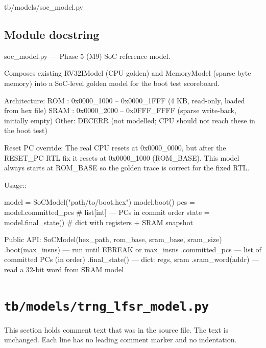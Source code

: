 \begin{relocated}{tb/models/soc_model.py}

\subsection*{Module docstring}

\begin{textblock}
soc_model.py — Phase 5 (M9) SoC reference model.

Composes existing RV32IModel (CPU golden) and MemoryModel (sparse byte
memory) into a SoC-level golden model for the boot test scoreboard.

Architecture:
ROM  : 0x0000_1000 – 0x0000_1FFF  (4 KB, read-only, loaded from hex file)
SRAM : 0x0000_2000 – 0x0FFF_FFFF  (sparse write-back, initially empty)
Other: DECERR (not modelled; CPU should not reach these in the boot test)

Reset PC override:
The real CPU resets at 0x0000_0000, but after the RESET_PC RTL fix it
resets at 0x0000_1000 (ROM_BASE).  This model always starts at ROM_BASE
so the golden trace is correct for the fixed RTL.

Usage::

model = SoCModel("path/to/boot.hex")
model.boot()
pcs  = model.committed_pcs    # list[int] — PCs in commit order
state = model.final_state()   # dict with registers + SRAM snapshot

Public API:
SoCModel(hex_path, rom_base, sram_base, sram_size)
.boot(max_insns)     — run until EBREAK or max_insns
.committed_pcs       — list of committed PCs (in order)
.final_state()       — dict: regs, sram
.sram_word(addr)     — read a 32-bit word from SRAM model
\end{textblock}

\end{relocated}

\section{\texttt{tb/models/trng\_lfsr\_model.py}}\label{tm:suite:trng-lfsr-model}

This section holds comment text that was in the source file. The text is unchanged. Each line has no leading comment marker and no indentation.

